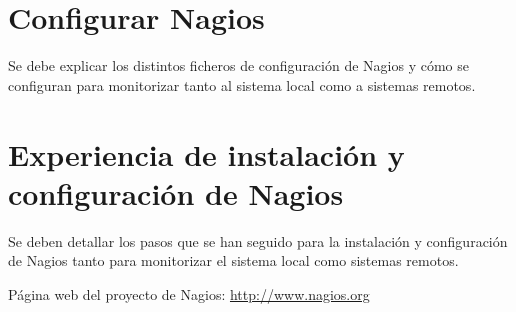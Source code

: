\documentclass[11pt,a4paper]{article}
\begin{document}
\section{Configurar Nagios}

Se debe explicar los distintos ficheros de configuración de Nagios y cómo se configuran para 
monitorizar tanto al sistema local como a sistemas remotos.

\section{Experiencia de instalación y configuración de  Nagios}

Se deben detallar los pasos que se han seguido para la instalación y configuración de Nagios
tanto para monitorizar el sistema local como sistemas remotos.

\begin{thebibliography}{1}

 Página web del proyecto de Nagios: \url{http://www.nagios.org}

\end{thebibliography}
\end{document}
